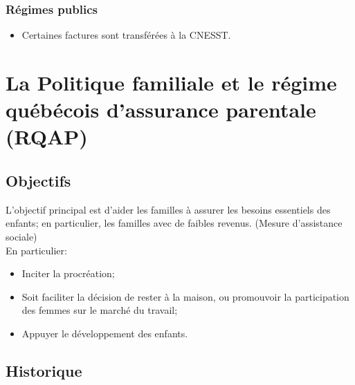 \documentclass[10pt, french]{article}
\begin{document}
\begin{multicols*}{3}
\subsubsection{Régimes publics}
\begin{itemize}
\item Certaines factures sont transférées à la CNESST. 
\end{itemize}


\newpage

\section{La Politique familiale et le régime québécois d’assurance parentale (RQAP)}

\subsection*{Objectifs}
L'objectif principal est d'aider les familles à assurer les besoins essentiels des enfants; en particulier, les familles avec de faibles revenus. (Mesure d'assistance sociale)\\

En particulier:
\begin{itemize}[leftmargin = *]
	\item	Inciter la procréation;
	\item	Soit faciliter la décision de rester à la maison, ou promouvoir la participation des femmes sur le marché du travail;
	\item	Appuyer le développement des enfants.
\end{itemize}

\subsection*{Historique}


\end{multicols*}
\end{document}
